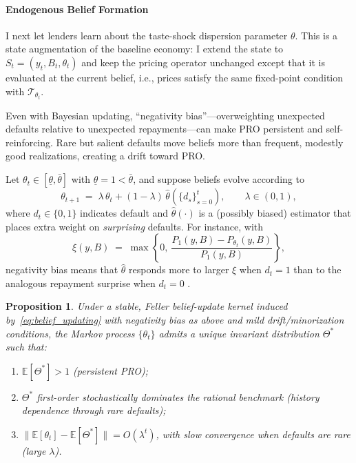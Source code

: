 \documentclass[12pt]{article}
\theoremstyle{plain}
\newtheorem{proposition}{Proposition}
\newcommand{\E}{\mathbb{E}}
\begin{document}
\paragraph{Endogenous Belief Formation}
I next let lenders learn about the taste-shock dispersion parameter $\theta$.
This is a state augmentation of the baseline economy: I extend the state to
$S_t=(y_t,B_t,\theta_t)$ and keep the pricing operator unchanged except that it
is evaluated at the current belief, i.e., prices satisfy the same fixed-point
condition with $\mathcal T_{\theta_t}$.

Even with Bayesian updating, ``negativity bias''---overweighting unexpected
defaults relative to unexpected repayments---can make PRO persistent and
self-reinforcing. Rare but salient defaults move beliefs more than frequent,
modestly good realizations, creating a drift toward PRO.

Let $\theta_t\in[\underline\theta,\bar\theta]$ with
$\underline\theta=1<\bar\theta$, and suppose beliefs evolve according to
\begin{equation}
	\theta_{t+1}\;=\; \lambda\,\theta_t + (1-\lambda)\,\widehat\theta(\{d_s\}_{s=0}^t),
	\qquad \lambda\in(0,1),
	\label{eq:belief_updating}
\end{equation}
where $d_t\in\{0,1\}$ indicates default and $\widehat\theta(\cdot)$ is a (possibly biased) estimator that places extra weight on \emph{surprising} defaults. For instance, with
\begin{equation}
	\xi(y,B)\;=\;\max\!\left\{0,\ \frac{P_1(y,B)-P_{\theta_t}(y,B)}{P_1(y,B)}\right\},
	\label{eq:surprise_intensity}
\end{equation}
negativity bias means that $\widehat\theta$ responds more to larger $\xi$ when $d_t=1$ than to the analogous repayment surprise when $d_t=0$  \citep{BaumeisterBratslavskyFinkenauer2001,BordaloGennaioliShleifer2018}.

\begin{proposition}\label{prop:endogenous_beliefs}
	Under a stable, Feller belief-update kernel induced by~\eqref{eq:belief_updating} with negativity bias as above and mild drift/minorization conditions, the Markov process $\{\theta_t\}$ admits a unique invariant distribution $\Theta^*$ such that:
	\begin{enumerate}
		\item[\textbf{(i)}] $\E[\Theta^*]>1$ (persistent PRO);
		\item[\textbf{(ii)}] $\Theta^*$ first-order stochastically dominates the rational benchmark (history dependence through rare defaults);
		\item[\textbf{(iii)}] $\|\E[\theta_t]-\E[\Theta^*]\|=O(\lambda^t)$, with slow convergence when defaults are rare (large $\lambda$).
	\end{enumerate}
\end{proposition}
\end{document}
